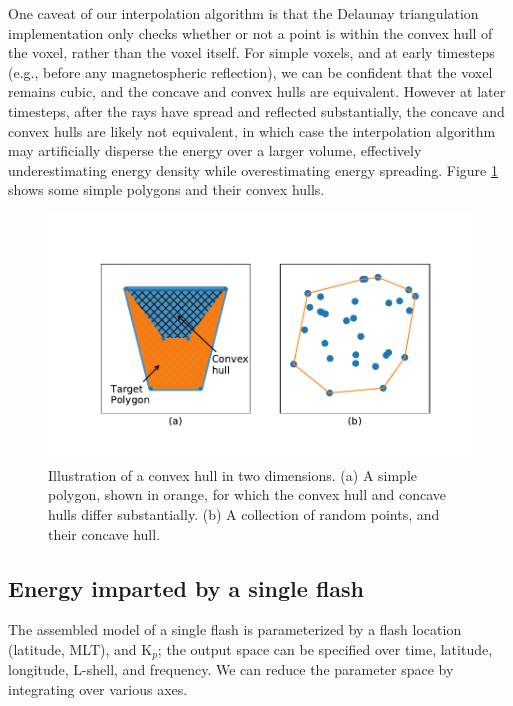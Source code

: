 One caveat of our interpolation algorithm is that the Delaunay triangulation implementation only checks whether or not a point is within the convex hull of the voxel, rather than the voxel itself. For simple voxels, and at early timesteps (e.g., before any magnetospheric reflection), we can be confident that the voxel remains cubic, and the concave and convex hulls are equivalent. However at later timesteps, after the rays have spread and reflected substantially, the concave and convex hulls are likely not equivalent, in which case the interpolation algorithm may artificially disperse the energy over a larger volume, effectively underestimating energy density while overestimating energy spreading. Figure \ref{fig:convex_hulls} shows some simple polygons and their convex hulls.
\begin{figure}[h]
\begin{center}
\includegraphics{figures/convex_hulls.pdf}
\caption[Qualitative illustration of convex and concave hulls]{Illustration of a convex hull in two dimensions. (a) A simple polygon, shown in orange, for which the convex hull and concave hulls differ substantially. (b) A collection of random points, and their concave hull.}
\label{fig:convex_hulls}
\end{center}
\end{figure}


\subsection{Energy imparted by a single flash}
The assembled model of a single flash is parameterized by a flash location (latitude, MLT), and K$_p$; the output space can be specified over time, latitude, longitude, L-shell, and frequency. We can reduce the parameter space by integrating over various axes.

